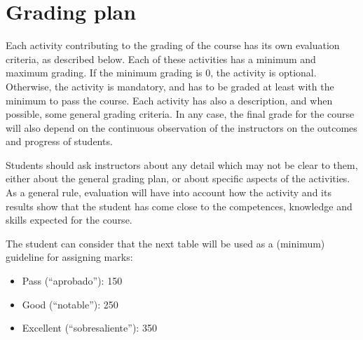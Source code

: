 \documentclass[a4paper]{article}
\begin{document}
\section{Grading plan}

Each activity contributing to the grading of the course has its own evaluation criteria, as described below. Each of these activities has a minimum and maximum grading. If the minimum grading is 0, the activity is optional. Otherwise, the activity is mandatory, and has to be graded at least with the minimum to pass the course. Each activity has also a description, and when possible, some general grading criteria. In any case, the final grade for the course will also depend on the continuous observation of the instructors on the outcomes and progress of students.

Students should ask instructors about any detail which may not be clear to them, either about the general grading plan, or about specific aspects of the activities. As a general rule, evaluation will have into account how the activity and its results show that the student has come close to the competences, knowledge and skills expected for the course.

The student can consider that the next table will be used as a (minimum) guideline for assigning marks:

\begin{itemize}
\item Pass (``aprobado''): 150
\item Good (``notable''): 250
\item Excellent (``sobresaliente''): 350
\end{itemize}
\end{document}
